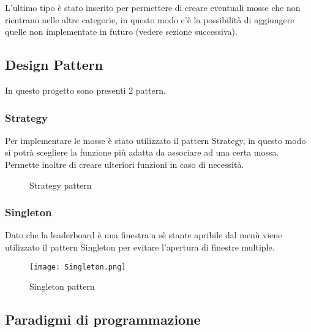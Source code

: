 \documentclass{article}
\begin{document}
\vspace{3pt}

L'ultimo tipo è stato inserito per permettere di creare eventuali mosse che non rientrano nelle altre categorie, in questo modo c'è la possibilità di aggiungere quelle non implementate in futuro (vedere sezione successiva). 

\newpage

\subsection{Design Pattern}

In questo progetto sono presenti 2 pattern.

\vspace{5pt}

\subsubsection{Strategy}

Per implementare le mosse è stato utilizzato il pattern Strategy, in questo modo si potrà scegliere la funzione più adatta da associare ad una certa mossa. Permette inoltre di creare ulteriori funzioni in caso di necessità. 

    \begin{figure}[ht]
        \centering
        \caption{Strategy pattern}
        \label{fig:strategy.png}
    \end{figure}

\newpage

\subsubsection{Singleton}

Dato che la leaderboard è una finestra a sè stante apribile dal menù viene utilizzato il pattern Singleton per evitare l'apertura di finestre multiple.

    \begin{figure}[ht]
        \centering
        \texttt{[image: Singleton.png]}
        \caption{Singleton pattern}
        \label{fig:singleton.png}
    \end{figure}

\newpage

\subsection{Paradigmi di programmazione}
\end{document}
